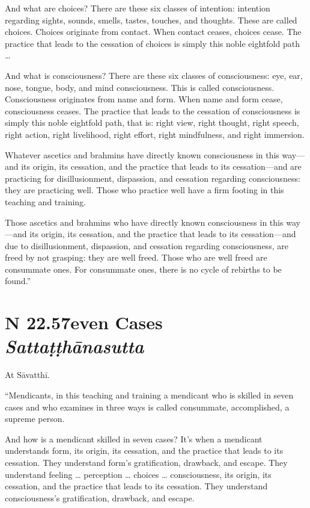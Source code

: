 \documentclass[12pt,openany]{book}%
\newcommand*{\suttatitleacronym}[1]{\smaller[2]{#1}\vspace*{.3em}}
\newcommand*{\suttatitletranslation}[1]{\linebreak{#1}}
\newcommand*{\suttatitleroot}[1]{\linebreak\smaller[2]\itshape{#1}}
\newcommand*{\tocacronym}[1]{\hspace*{-3.3em}{#1}\quad}
\newcommand*{\toctranslation}[1]{#1}
\newcommand*{\tocroot}[1]{(\textit{#1})}
\begin{document}
And what are choices? There are these six classes of intention: intention regarding sights, sounds, smells, tastes, touches, and thoughts. These are called choices. Choices originate from contact. When contact ceases, choices cease. The practice that leads to the cessation of choices is simply this noble eightfold path … 

And what is consciousness? There are these six classes of consciousness: eye, ear, nose, tongue, body, and mind consciousness. This is called consciousness. Consciousness originates from name and form. When name and form cease, consciousness ceases. The practice that leads to the cessation of consciousness is simply this noble eightfold path, that is: right view, right thought, right speech, right action, right livelihood, right effort, right mindfulness, and right immersion. 

Whatever ascetics and brahmins have directly known consciousness in this way—and its origin, its cessation, and the practice that leads to its cessation—and are practicing for disillusionment, dispassion, and cessation regarding consciousness: they are practicing well. Those who practice well have a firm footing in this teaching and training. 

Those ascetics and brahmins who have directly known consciousness in this way—and its origin, its cessation, and the practice that leads to its cessation—and due to disillusionment, dispassion, and cessation regarding consciousness, are freed by not grasping: they are well freed. Those who are well freed are consummate ones. For consummate ones, there is no cycle of rebirths to be found.” 

%
\section*{{\suttatitleacronym SN 22.57}{\suttatitletranslation Seven Cases }{\suttatitleroot Sattaṭṭhānasutta}}
\addcontentsline{toc}{section}{\tocacronym{SN 22.57} \toctranslation{Seven Cases } \tocroot{Sattaṭṭhānasutta}}

At \textsanskrit{Sāvatthī}. 

“Mendicants, in this teaching and training a mendicant who is skilled in seven cases and who examines in three ways is called consummate, accomplished, a supreme person. 

And how is a mendicant skilled in seven cases? It’s when a mendicant understands form, its origin, its cessation, and the practice that leads to its cessation. They understand form’s gratification, drawback, and escape. They understand feeling … perception … choices … consciousness, its origin, its cessation, and the practice that leads to its cessation. They understand consciousness’s gratification, drawback, and escape. 
\end{document}
